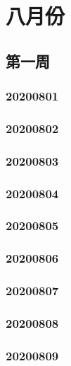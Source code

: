 \chapter{八月份}
  \section{第一周}
  \subsection{20200801}
  
  \subsection{20200802}
  
  \subsection{20200803}
  
  \subsection{20200804}
  
  \subsection{20200805}
  
  \subsection{20200806}
  
  \subsection{20200807}
  
  \subsection{20200808}
  
  \subsection{20200809}
  

